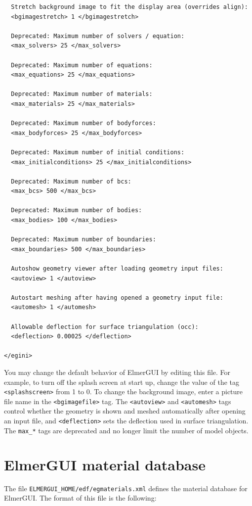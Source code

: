 \begin{footnotesize}
\begin{verbatim}
  Stretch background image to fit the display area (overrides align):
  <bgimagestretch> 1 </bgimagestretch>

  Deprecated: Maximum number of solvers / equation:
  <max_solvers> 25 </max_solvers>

  Deprecated: Maximum number of equations:
  <max_equations> 25 </max_equations>

  Deprecated: Maximum number of materials:
  <max_materials> 25 </max_materials>

  Deprecated: Maximum number of bodyforces:
  <max_bodyforces> 25 </max_bodyforces>

  Deprecated: Maximum number of initial conditions:
  <max_initialconditions> 25 </max_initialconditions>

  Deprecated: Maximum number of bcs:
  <max_bcs> 500 </max_bcs>

  Deprecated: Maximum number of bodies:
  <max_bodies> 100 </max_bodies>

  Deprecated: Maximum number of boundaries:
  <max_boundaries> 500 </max_boundaries>

  Autoshow geometry viewer after loading geometry input files:
  <autoview> 1 </autoview>

  Autostart meshing after having opened a geometry input file:
  <automesh> 1 </automesh>

  Allowable deflection for surface triangulation (occ):
  <deflection> 0.00025 </deflection>

</egini>
\end{verbatim}
\end{footnotesize}

You may change the default behavior of ElmerGUI by editing this file. For example, to turn off the splash screen at start up, change the value of the tag {\tt <splashscreen>} from 1 to 0. To change the background image, enter a picture file name in the {\tt <bgimagefile>} tag. The {\tt <autoview>} and {\tt <automesh>} tags control whether the geometry is shown and meshed automatically after opening an input file, and {\tt <deflection>} sets the deflection used in surface triangulation. The {\tt max\_*} tags are deprecated and no longer limit the number of model objects.

\chapter{ElmerGUI material database}

The file {\tt ELMERGUI\_HOME/edf/egmaterials.xml} defines the material database for ElmerGUI. The
format of this file is the following:

